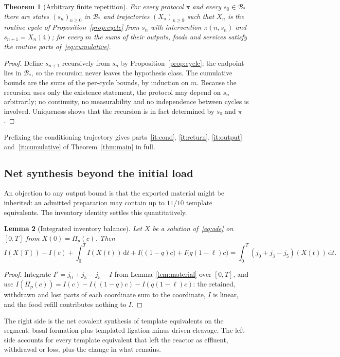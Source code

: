 \documentclass[11pt,a4paper]{article}
\theoremstyle{plain}
\newtheorem{theorem}{Theorem}[section]
\newtheorem{lemma}[theorem]{Lemma}
\theoremstyle{definition}
\theoremstyle{remark}
\newcommand{\dd}{\,\mathrm d}
\newcommand{\Bstar}{\mathcal B_*}
\newcommand{\Pulse}{\Pi}
\newcommand{\Iv}{I}
\begin{document}
\begin{theorem}[Arbitrary finite repetition]\label{thm:repeat}
For every protocol $\pi$ and every $s_0\in\Bstar$ there are states $(s_n)_{n\ge0}$ in $\Bstar$ and trajectories $(X_n)_{n\ge0}$ such that $X_n$ is the routine cycle of Proposition~\ref{prop:cycle} from $s_n$ with intervention $\pi(n,s_n)$ and $s_{n+1}=X_n(4)$; for every $m$ the sums of their outputs, foods and services satisfy the routine parts of~\eqref{eq:cumulative}.
\end{theorem}
\begin{proof}
Define $s_{n+1}$ recursively from $s_n$ by Proposition~\ref{prop:cycle}; the endpoint lies in $\Bstar$, so the recursion never leaves the hypothesis class. The cumulative bounds are the sums of the per-cycle bounds, by induction on $m$. Because the recursion uses only the existence statement, the protocol may depend on $s_n$ arbitrarily; no continuity, no measurability and no independence between cycles is involved. Uniqueness shows that the recursion is in fact determined by $s_0$ and $\pi$.
\end{proof}
Prefixing the conditioning trajectory gives parts~\ref{it:cond}, \ref{it:return}, \ref{it:output} and~\ref{it:cumulative} of Theorem~\ref{thm:main} in full.

\subsection{Net synthesis beyond the initial load}
An objection to any output bound is that the exported material might be inherited: an admitted preparation may contain up to $11/10$ template equivalents. The inventory identity settles this quantitatively.

\begin{lemma}[Integrated inventory balance]\label{lem:balance}
Let $X$ be a solution of~\eqref{eq:ode} on $[0,T]$ from $X(0)=\Pulse_p(c)$. Then
\begin{equation}\label{eq:fullbalance}
\Iv(X(T))-\Iv(c)+\int_0^T\Iv(X(t))\dd t+\Iv\bigl((1-q)c\bigr)+\Iv\bigl(q(1-\ell)c\bigr)
=\int_0^T(j_0+j_3-j_5)(X(t))\dd t .
\end{equation}
\end{lemma}
\begin{proof}
Integrate $\Iv'=j_0+j_3-j_5-\Iv$ from Lemma~\ref{lem:material} over $[0,T]$, and use $\Iv(\Pulse_p(c))=\Iv(c)-\Iv((1-q)c)-\Iv(q(1-\ell)c)$: the retained, withdrawn and lost parts of each coordinate sum to the coordinate, $\Iv$ is linear, and the food refill contributes nothing to $\Iv$.
\end{proof}
The right side is the net covalent synthesis of template equivalents on the segment: basal formation plus templated ligation minus driven cleavage. The left side accounts for every template equivalent that left the reactor as effluent, withdrawal or loss, plus the change in what remains.
\end{document}
